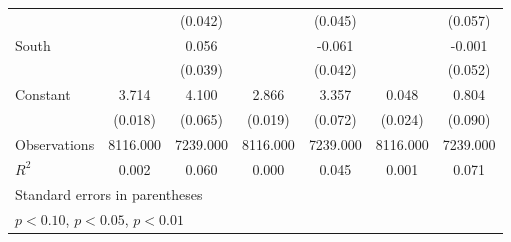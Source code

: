 {\begin{tabular}{l*{6}{c}}
                    &                     &     (0.042)         &                     &     (0.045)         &                     &     (0.057)         \\
\addlinespace
South               &                     &       0.056         &                     &      -0.061         &                     &      -0.001         \\
                    &                     &     (0.039)         &                     &     (0.042)         &                     &     (0.052)         \\
\addlinespace
Constant            &       3.714\sym{***}&       4.100\sym{***}&       2.866\sym{***}&       3.357\sym{***}&       0.048\sym{**} &       0.804\sym{***}\\
                    &     (0.018)         &     (0.065)         &     (0.019)         &     (0.072)         &     (0.024)         &     (0.090)         \\
\midrule
Observations        &    8116.000         &    7239.000         &    8116.000         &    7239.000         &    8116.000         &    7239.000         \\
\(R^{2}\)           &       0.002         &       0.060         &       0.000         &       0.045         &       0.001         &       0.071         \\
\bottomrule
\multicolumn{7}{l}{\footnotesize Standard errors in parentheses}\\
\multicolumn{7}{l}{\footnotesize \sym{*} \(p<0.10\), \sym{**} \(p<0.05\), \sym{***} \(p<0.01\)}\\
\end{tabular}
}

